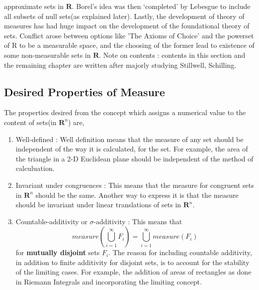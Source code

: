 approximate sets in $\bm{R}$. Borel's idea was then `completed' by Lebesgue to
include all subsets of null sets(as explained later).
\newline
Lastly, the development of theory of measures has had huge impact on the
development of the foundational theory of sets. Conflict arose between options
like 'The Axioms of Choice' and the powerset of R to be a measurable space, and
the choosing of the former lead to existence of some non-measurable sets in
$\bm{R}$.
\newline
Note on contents : contents in this section and the remaining chapter are
written after majorly studying Stillwell\cite{stillwell},
Schilling\cite{schilling}.

\subsection{Desired Properties of Measure}
The properties desired from the concept which assigns a numerical value to the
content of sets(in $\bm{R}^n$) are,
\begin{enumerate}
    \item Well-defined : Well definition means that the measure of any set
        should be independent of the way it is calculated, for the set. For
        example, the area of the triangle in a 2-D Euclidean plane should be
        independent of the method of calculuation.
    \item Invariant under congruences : This means that the measure for
        congruent sets in $\bm{R}^n$ should be the same. Another way to express
        it is that the measure should be invariant under linear translations of
        sets in $\bm{R}^n$.
    \item Countable-additivity or $\sigma$-additivity : This means that 
        \begin{equation}
            measure(\bigcup_{i=1}^{\infty} F_{i}) = \bigcup_{i=1}^{\infty}
            measure(F_{i}) 
        \end{equation}
        for \textbf{mutually disjoint} sets $F_{i}$.
        The reason for including countable additivity, in addition to finite
        additivity for disjoint sets, is to account for the stability of the
        limiting cases. For example, the addition of areas of rectangles as done
        in Riemann Integrals and incorporating the limiting concept.
\end{enumerate}



